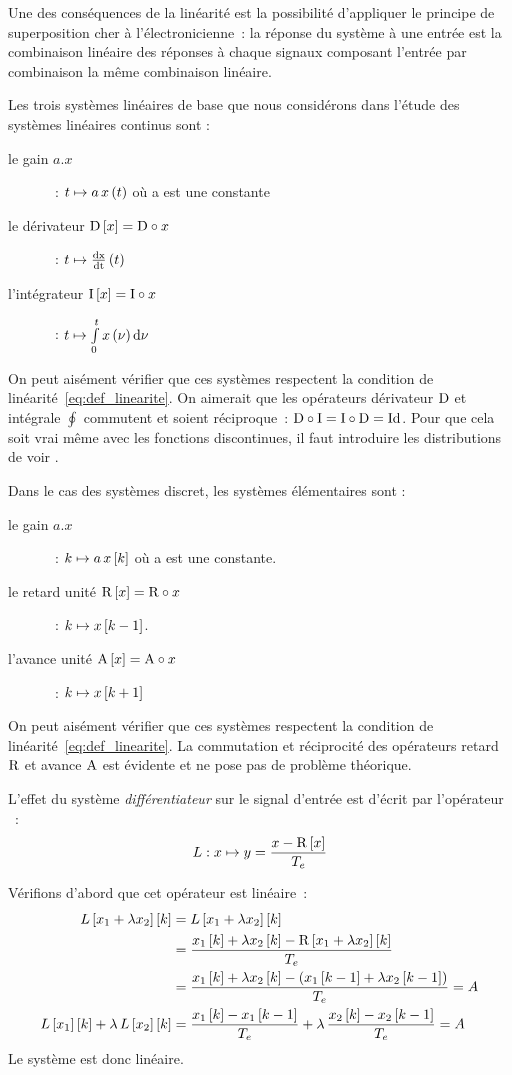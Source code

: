 Une des conséquences de la linéarité est la possibilité d'appliquer le
principe de superposition cher à l'électronicienne~: la réponse du
système à une entrée est la combinaison linéaire des réponses à chaque
signaux composant l'entrée par combinaison la même combinaison
linéaire.
	
Les trois systèmes linéaires de base que nous considérons dans
l'étude des systèmes linéaires continus sont :
\begin{description}
\item[le gain $a.x$]~: $t \mapsto a\,x\left(t\right)$ où a est une constante
\item[le dérivateur $\mathrm{D}\left[x\right]=\mathrm{D}\circ x$]~: $ t \mapsto \frac{\mathrm{d{x}}}{\mathrm{d{t}}}\left(t\right) $
\item[l'intégrateur $\mathrm{I}\left[x\right]=\mathrm{I}\circ x$]~: $ t \mapsto \int\limits_{0}^{t}{x\left(\nu\right)\mathrm{d{\nu}}}$ 
\end{description}
On peut aisément vérifier que ces systèmes respectent la condition de
linéarité~\ref{eq:def_linearite}. On aimerait que les opérateurs
dérivateur $\mathrm{D}$ et intégrale $\oint$ commutent et soient
réciproque~: $\mathrm{D}\circ\mathrm{I}=\mathrm{I}\circ\mathrm{D}=\mathrm{Id}$. Pour que cela soit
vrai même avec les fonctions discontinues, il faut introduire les
distributions de \Dirac{} voir .

Dans le cas des systèmes discret, les systèmes élémentaires sont :
\begin{description}
\item[le gain $a.x$]~: $ k \mapsto a\,x\left[k\right]$ où a est une constante.
\item[le retard unité $\mathrm{R}\left[x\right]=\mathrm{R}\circ x$]~: $ k \mapsto x\left[k-1\right]$.
\item[l'avance unité $\mathrm{A}\left[x\right]=\mathrm{A}\circ x$]~: $ k \mapsto x\left[k+1\right] $ 
\end{description}

On peut aisément vérifier que ces systèmes respectent la condition de
linéarité~\ref{eq:def_linearite}. La commutation et réciprocité des
opérateurs retard $\mathrm{R}$ et avance $\mathrm{A}$ est évidente et ne pose
pas de problème théorique.

\begin{exemple}
  \label{exemple:differentiateur_lineaire}
  L'effet du système \emph{différentiateur} sur le signal d'entrée est d'écrit par
  l'opérateur ~: $$L : x \mapsto y=\frac{x-\mathrm{R}\left[x\right]}{T_e}$$

  Vérifions d'abord que cet opérateur est linéaire~:
  \begin{eqnarray*}
    L\left[x_1+\lambda x_2\right]\left[k\right] &= L\left[x_1+\lambda x_2\right]\left[k\right]\\
                         &= \frac{x_1\left[k\right]+\lambda x_2\left[k\right] - \mathrm{R}\left[x_1+\lambda x_2\right]\left[k\right]}{T_e}\\
                         &= \frac{x_1\left[k\right]+\lambda x_2\left[k\right] - \left(x_1\left[k-1\right]+\lambda x_2\left[k-1\right]\right)}{T_e} = A\\
   L\left[x_{1}\right]\left[k\right]+\lambda\,L\left[x_{2}\right]\left[k\right]  &= \frac{x_1\left[k\right] - x_1\left[k-1\right]}{T_e}+\lambda\,\frac{x_2\left[k\right] - x_2\left[k-1\right]}{T_e}=A
  \end{eqnarray*}
  Le système est donc linéaire.
\end{exemple}


